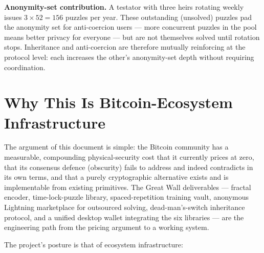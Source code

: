 \documentclass[a4paper,11pt]{article}
\begin{document}
\noindent\textbf{Anonymity-set contribution.} A testator with three heirs rotating weekly issues $3 \times 52 = 156$ puzzles per year. These outstanding (unsolved) puzzles pad the anonymity set for anti-coercion users --- more concurrent puzzles in the pool means better privacy for everyone --- but are not themselves solved until rotation stops. Inheritance and anti-coercion are therefore mutually reinforcing at the protocol level: each increases the other's anonymity-set depth without requiring coordination.

\section{Why This Is Bitcoin-Ecosystem Infrastructure}

The argument of this document is simple: the Bitcoin community has a measurable, compounding physical-security cost that it currently prices at zero, that its consensus defence (obscurity) fails to address and indeed contradicts in its own terms, and that a purely cryptographic alternative exists and is implementable from existing primitives. The Great Wall deliverables --- fractal encoder, time-lock-puzzle library, spaced-repetition training vault, anonymous Lightning marketplace for outsourced solving, dead-man's-switch inheritance protocol, and a unified desktop wallet integrating the six libraries --- are the engineering path from the pricing argument to a working system.

The project's posture is that of ecosystem infrastructure:
\end{document}
